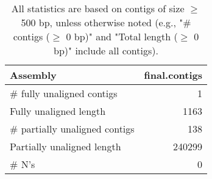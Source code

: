\documentclass[12pt,a4paper]{article}
\begin{document}
\begin{table}[ht]
\begin{center}
\caption{All statistics are based on contigs of size $\geq$ 500 bp, unless otherwise noted (e.g., "\# contigs ($\geq$ 0 bp)" and "Total length ($\geq$ 0 bp)" include all contigs).}
\begin{tabular}{|l*{1}{|r}|}
\hline
Assembly & final.contigs \\ \hline
\# fully unaligned contigs & 1 \\ \hline
Fully unaligned length & 1163 \\ \hline
\# partially unaligned contigs & 138 \\ \hline
Partially unaligned length & 240299 \\ \hline
\# N's & 0 \\ \hline
\end{tabular}
\end{center}
\end{table}
\end{document}
